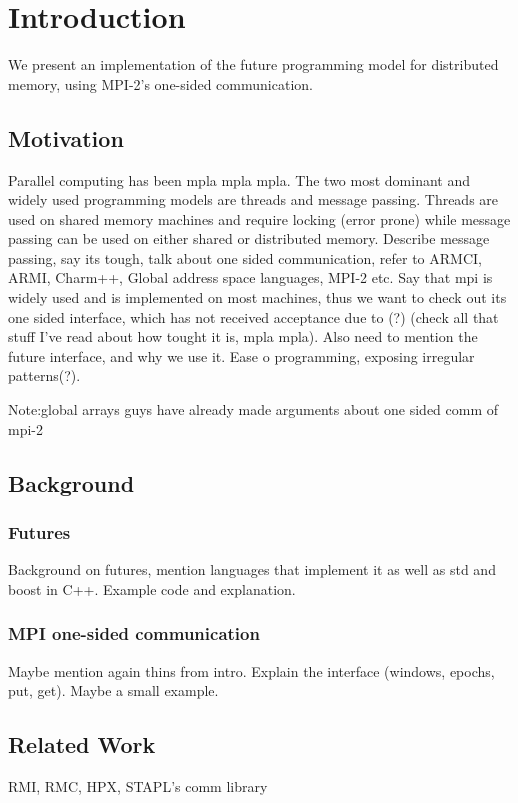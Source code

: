 \chapter{Introduction}
We present an implementation of the future programming model for distributed memory,
using MPI-2's one-sided communication.


\section{Motivation}
Parallel computing has been mpla mpla mpla.
The two most dominant and widely used programming models are threads and message passing.
Threads are used on shared memory machines and require locking (error prone) while message
passing can be used on either shared or distributed memory. Describe message passing, say
its tough, talk about one sided communication, refer to ARMCI, ARMI, Charm++, Global address
space languages, MPI-2 etc.  Say that mpi is widely used and is implemented on most machines,
thus we want to check out its one sided interface, which has not received acceptance due to (?)
(check all that stuff I've read about how tought it is, mpla mpla).  Also need to mention the
future interface, and why we use it. Ease o programming, exposing irregular patterns(?).

Note:global arrays guys have already made arguments about one sided comm of mpi-2 

\section{Background}
\subsection{Futures}
Background on futures, mention languages that implement it as well as std and boost in C++.
Example code and explanation.
\subsection{MPI one-sided communication}
Maybe mention again thins from intro.  Explain the interface (windows, epochs, put, get).
Maybe a small example.

\section{Related Work}
RMI, RMC, HPX, STAPL's comm library

